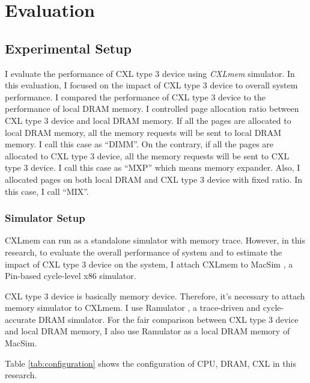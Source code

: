 \chapter{Evaluation} \label{sec:evaluation}

\section{Experimental Setup} \label{sec:exp-setup}

I evaluate the performance of CXL type 3 device using \textit{CXLmem} simulator. In this evaluation, I focused on the impact of CXL type 3 device to overall system performance. I compared the performance of CXL type 3 device to the performance of local DRAM memory. I controlled page allocation ratio between CXL type 3 device and local DRAM memory. If all the pages are allocated to local DRAM memory, all the memory requests will be sent to local DRAM memory. I call this case as ``DIMM''. On the contrary, if all the pages are allocated to CXL type 3 device, all the memory requests will be sent to CXL type 3 device. I call this case as ``MXP'' which means memory expander. Also, I allocated pages on both local DRAM and CXL type 3 device with fixed ratio. In this case, I call ``MIX''.

\subsection{Simulator Setup}
\label{sec:simulator-setup}
CXLmem can run as a standalone simulator with memory trace. However, in this research, to evaluate the overall performance of system and to estimate the impact of CXL type 3 device on the system, I attach CXLmem to MacSim \cite{MACSIM}, a Pin-based cycle-level x86 simulator.

CXL type 3 device is basically memory device. Therefore, it's necessary to attach memory simulator to CXLmem. I use Ramulator \cite{RAMULATOR}, a trace-driven and cycle-accurate DRAM simulator. For the fair comparison between CXL type 3 device and local DRAM memory, I also use Ramulator as a local DRAM memory of MacSim.

Table \ref{tab:configuration} shows the configuration of CPU, DRAM, CXL in this research.

